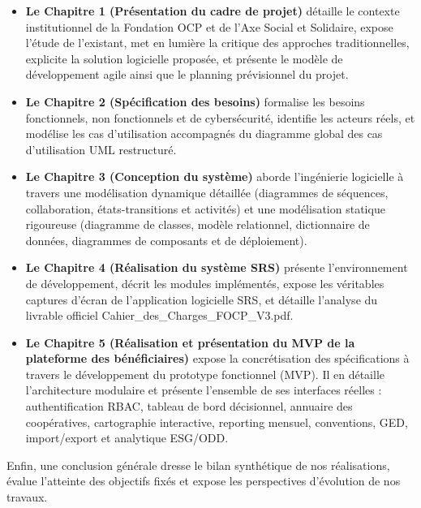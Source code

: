 \begin{itemize}
    \item \textbf{Le Chapitre 1 (Présentation du cadre de projet)} détaille le contexte institutionnel de la Fondation OCP et de l'Axe Social et Solidaire, expose l'étude de l'existant, met en lumière la critique des approches traditionnelles, explicite la solution logicielle proposée, et présente le modèle de développement agile ainsi que le planning prévisionnel du projet.
    \item \textbf{Le Chapitre 2 (Spécification des besoins)} formalise les besoins fonctionnels, non fonctionnels et de cybersécurité, identifie les acteurs réels, et modélise les cas d'utilisation accompagnés du diagramme global des cas d'utilisation UML restructuré.
    \item \textbf{Le Chapitre 3 (Conception du système)} aborde l'ingénierie logicielle à travers une modélisation dynamique détaillée (diagrammes de séquences, collaboration, états-transitions et activités) et une modélisation statique rigoureuse (diagramme de classes, modèle relationnel, dictionnaire de données, diagrammes de composants et de déploiement).
    \item \textbf{Le Chapitre 4 (Réalisation du système SRS)} présente l'environnement de développement, décrit les modules implémentés, expose les véritables captures d'écran de l'application logicielle SRS, et détaille l'analyse du livrable officiel {\ttfamily Cahier\allowbreak\_\allowbreak des\allowbreak\_\allowbreak Charges\allowbreak\_\allowbreak FOCP\allowbreak\_\allowbreak V3.pdf}.
    \item \textbf{Le Chapitre 5 (Réalisation et présentation du MVP de la plateforme des bénéficiaires)} expose la concrétisation des spécifications à travers le développement du prototype fonctionnel (MVP). Il en détaille l'architecture modulaire et présente l'ensemble de ses interfaces réelles : authentification RBAC, tableau de bord décisionnel, annuaire des coopératives, cartographie interactive, reporting mensuel, conventions, GED, import/export et analytique ESG/ODD.
\end{itemize}

Enfin, une conclusion générale dresse le bilan synthétique de nos réalisations, évalue l'atteinte des objectifs fixés et expose les perspectives d'évolution de nos travaux.

\newpage

